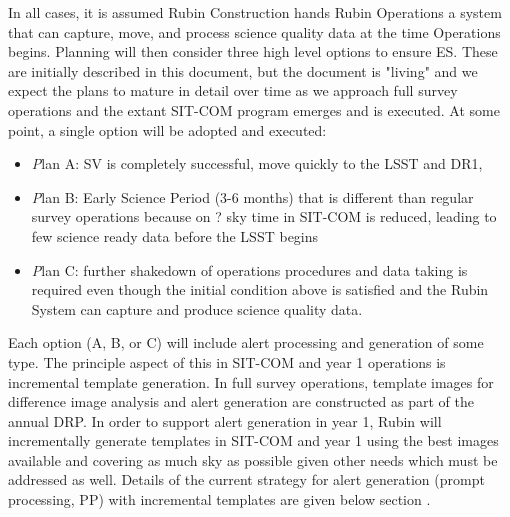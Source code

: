 In all cases, it is assumed Rubin Construction hands Rubin Operations a system that can capture, move, and process science quality data at the time Operations begins. Planning will then consider three high level options to ensure ES. These are initially described in this document, but the document is "living" and we expect the plans to mature in detail over time as we approach full survey operations and the extant SIT-COM program emerges and is executed. At some point, a single option will be adopted and executed:

\begin{itemize}
\item {\textit Plan A:} SV is completely successful, move quickly to the LSST and DR1,
\item {\textit Plan B:} Early Science Period (3-6 months) that is different than regular survey operations because on ? sky time in SIT-COM is reduced, leading to few science ready data before the LSST begins
\item {\textit Plan C:} further shakedown of operations procedures and data taking is required even though the initial condition above is satisfied and the Rubin System can capture and produce science quality data.

\end{itemize}

Each option (A, B, or C) will include alert processing and generation of some type. The principle aspect of this in SIT-COM and year 1 operations is incremental template generation. In full survey operations, template images for difference image analysis and alert generation are constructed as part of the annual DRP. In order to support alert generation in year 1, Rubin will incrementally generate templates in SIT-COM and year 1 using the best images available and covering as much sky as possible given other needs which must be addressed as well. Details of the current strategy for alert generation (prompt processing, PP) with incremental templates are given below section .  
